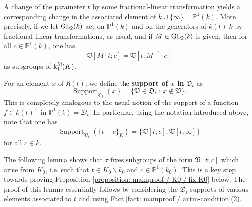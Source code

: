 \documentclass[11pt]{amsart}
\theoremstyle{definition}
\theoremstyle{remark}
\numberwithin{equation}{section}
\DeclareMathOperator{\Supp}{Support}
\newcommand{\Pbb}{\mathbb{P}}
\newcommand{\Dcal}{\mathscr{D}}
\newcommand{\Kfrak}{\mathfrak{K}}
\newcommand{\Dfrak}{\mathfrak{D}}
\newcommand{\Vfrak}{\mathfrak{V}}
\renewcommand{\k}{\operatorname{k}^{\rm M}}
\begin{document}
A change of the parameter $t$ by some fractional-linear transformation yields a corresponding change in the associated element of $k \cup \{\infty\} = \Pbb^1(k)$.
More precisely, if we let ${\rm GL}_2(k)$ act on $\Pbb^1(k)$ and on the generators of $k(t)|k$ by fractional-linear transformations, as usual, and if $M \in {\rm GL}_2(k)$ is given, then for all $c \in \Pbb^1(k)$, one has
\[ \Vfrak[M \cdot t;c] = \Vfrak[t;M^{-1} \cdot c] \]
as subgroups of $\k_1(K)$.

For an element $x$ of $\Kfrak(t)$, we define the {\bf support of $x$ in $\Dfrak_t$} as
\[ \Supp_{\Dfrak_t}(x) = \{\Vfrak \in \Dfrak_t \ : \ x \notin \Vfrak \}.\]
This is completely analogous to the usual notion of the support of a function $f \in k(t)^\times$ in $\Pbb^1(k) = \Dcal_t$.
In particular, using the notation introduced above, note that one has
\[ \Supp_{\Dfrak_t}(\{t-c\}_K) = \{\Vfrak[t;c],\Vfrak[t;\infty]\}\]
for all $c \in k$.

The following lemma shows that $\tau$ fixes subgroups of the form $\Vfrak[t;c]$ which arise from $K_0$, i.e. such that $t \in K_0 \smallsetminus k_0$ and $c \in \Pbb^1(k_0)$.
This is a key step towards proving Proposition \ref{proposition: mainproof / K0 / fix-K0} below.
The proof of this lemma essentially follows by considering the $\Dfrak_t$-supports of various elements associated to $t$ and using Fact \ref{fact: mainproof / autm-condition}(2).
\end{document}

